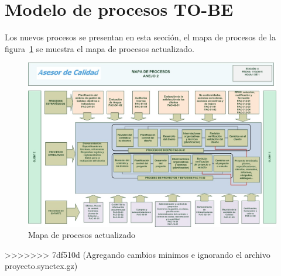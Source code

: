 
%
%
%

\section{Modelo de procesos TO-BE}


Los nuevos procesos se presentan en esta sección, el mapa de procesos de la figura~\ref{fig:mapaProcNvo} se muestra el mapa de procesos actualizado.

\begin{figure}[htbp]
	\begin{center}
		\includegraphics[width=.8\textwidth]{images/mapaProc}
		\caption{Mapa de procesos actualizado}
		\label{fig:mapaProcNvo}
	\end{center}
\end{figure}



%
%
%

>>>>>>> 7df510d (Agregando cambios minimos e ignorando el archivo proyecto.synctex.gz)
